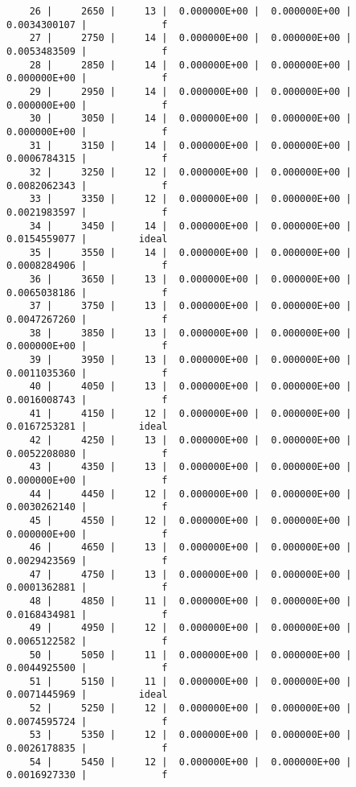 \documentclass[
  authoryear,
  preprint,
  3p]{elsarticle}
\begin{document}
\begin{verbatim}
    26 |     2650 |     13 |  0.000000E+00 |  0.000000E+00 |  0.0034300107 |             f
    27 |     2750 |     14 |  0.000000E+00 |  0.000000E+00 |  0.0053483509 |             f
    28 |     2850 |     14 |  0.000000E+00 |  0.000000E+00 |  0.000000E+00 |             f
    29 |     2950 |     14 |  0.000000E+00 |  0.000000E+00 |  0.000000E+00 |             f
    30 |     3050 |     14 |  0.000000E+00 |  0.000000E+00 |  0.000000E+00 |             f
    31 |     3150 |     14 |  0.000000E+00 |  0.000000E+00 |  0.0006784315 |             f
    32 |     3250 |     12 |  0.000000E+00 |  0.000000E+00 |  0.0082062343 |             f
    33 |     3350 |     12 |  0.000000E+00 |  0.000000E+00 |  0.0021983597 |             f
    34 |     3450 |     14 |  0.000000E+00 |  0.000000E+00 |  0.0154559077 |         ideal
    35 |     3550 |     14 |  0.000000E+00 |  0.000000E+00 |  0.0008284906 |             f
    36 |     3650 |     13 |  0.000000E+00 |  0.000000E+00 |  0.0065038186 |             f
    37 |     3750 |     13 |  0.000000E+00 |  0.000000E+00 |  0.0047267260 |             f
    38 |     3850 |     13 |  0.000000E+00 |  0.000000E+00 |  0.000000E+00 |             f
    39 |     3950 |     13 |  0.000000E+00 |  0.000000E+00 |  0.0011035360 |             f
    40 |     4050 |     13 |  0.000000E+00 |  0.000000E+00 |  0.0016008743 |             f
    41 |     4150 |     12 |  0.000000E+00 |  0.000000E+00 |  0.0167253281 |         ideal
    42 |     4250 |     13 |  0.000000E+00 |  0.000000E+00 |  0.0052208080 |             f
    43 |     4350 |     13 |  0.000000E+00 |  0.000000E+00 |  0.000000E+00 |             f
    44 |     4450 |     12 |  0.000000E+00 |  0.000000E+00 |  0.0030262140 |             f
    45 |     4550 |     12 |  0.000000E+00 |  0.000000E+00 |  0.000000E+00 |             f
    46 |     4650 |     13 |  0.000000E+00 |  0.000000E+00 |  0.0029423569 |             f
    47 |     4750 |     13 |  0.000000E+00 |  0.000000E+00 |  0.0001362881 |             f
    48 |     4850 |     11 |  0.000000E+00 |  0.000000E+00 |  0.0168434981 |             f
    49 |     4950 |     12 |  0.000000E+00 |  0.000000E+00 |  0.0065122582 |             f
    50 |     5050 |     11 |  0.000000E+00 |  0.000000E+00 |  0.0044925500 |             f
    51 |     5150 |     11 |  0.000000E+00 |  0.000000E+00 |  0.0071445969 |         ideal
    52 |     5250 |     12 |  0.000000E+00 |  0.000000E+00 |  0.0074595724 |             f
    53 |     5350 |     12 |  0.000000E+00 |  0.000000E+00 |  0.0026178835 |             f
    54 |     5450 |     12 |  0.000000E+00 |  0.000000E+00 |  0.0016927330 |             f

\end{verbatim}
\end{document}

